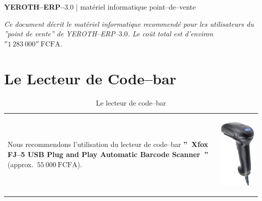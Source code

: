 \documentclass[12pt, a4paper]{article}
\newcommand{\yerotherp}{\textcolor{yerenColorBlue}{\sc YEROTH--ERP--$3.0$}\xspace}
\newcommand{\chapintro}[1]{\textcolor{purplish}{\emph{#1}}\xspace}
\newcommand{\money}[1]{$#1\ \text{FCFA}$}
\begin{document}
{\bf \LARGE \yerotherp} {| \sc \scriptsize mat\'eriel informatique point--de--vente}

\vspace{2em}

\parbox{31em}{
\chapintro{
Ce document d\'ecrit le mat\'eriel informatique
recommend\'e pour les utilisateurs du
''point de vente'' de \yerotherp.
Le co\^ut total est d'environ \money{''1~283~000''}.\\}
}

\vspace{0em}

\section{Le Lecteur de Code--bar}
\vspace{-3em}

\begin{table}[!htbp]
\begin{tabular}{lr}
\parbox{25em}{
Nous recommendons l'utilisation du lecteur
de code--bar \textbf{''~Xfox FJ--5 USB Plug and Play Automatic
Barcode Scanner~''} (approx.~\money{55~000}).
\vspace{-3em}
}

&

\parbox{17em}{
\begin{center}
\includegraphics[scale=0.2]{images/xfox-fj-5-usb-plug-and-play-automatic-barcode-scanner.png}
\caption*{Le lecteur de code--bar}
\end{center}
}
\end{tabular}
\end{table}
\end{document}
